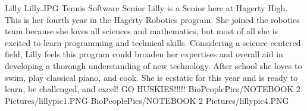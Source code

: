 \insertbio
{Lilly}
{Lilly.JPG}
{Tennis}
{Software}
{Senior}
{
Lilly is a Senior here at Hagerty High. This is her fourth year in the Hagerty Robotics program. She joined the robotics team because she loves all sciences and mathematics, but most of all she is excited to learn programming and technical skills. Considering a science centered field, Lilly feels this program could broaden her expertises and overall aid in developing a thorough understanding of new technology. After school she loves to swim, play classical piano, and cook. She is ecstatic for this year and is ready to learn, be challenged, and excel! GO HUSKIES!!!!!
}
{BioPeoplePics/NOTEBOOK 2 Pictures/lillypic1.PNG}
{BioPeoplePics/NOTEBOOK 2 Pictures/lillypic4.PNG}